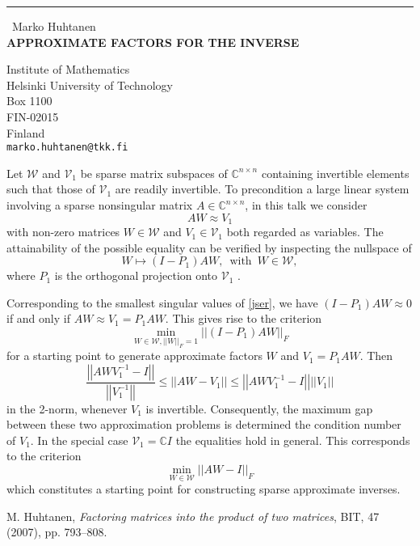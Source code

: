 \documentclass{report}
\begin{document}
\begin{center}
\rule{6in}{1pt} \
{\large Marko Huhtanen \\
{\bf APPROXIMATE FACTORS FOR THE INVERSE}}

Institute of Mathematics \\ Helsinki University of Technology \\ Box 1100 \\ FIN-02015 \\ Finland
\\
{\tt marko.huhtanen@tkk.fi}\end{center}

\def\setC{\mathbb{C}}

Let $\mathcal{W}$ and $\mathcal{V}_1$ be sparse matrix subspaces
of $\setC^{n \times n}$ containing
invertible elements such that those
of $\mathcal{V}_1$ are readily invertible.
To precondition a large linear system involving
a sparse nonsingular matrix $A\in \setC^{n \times n}$,
in this talk we consider
\begin{equation}\label{aproksi}
AW\approx V_1
\end{equation}
with non-zero matrices $W \in \mathcal{W}$ and $V_1 \in \mathcal{V}_1$
both regarded as variables.
The attainability of the possible equality
can be
verified by inspecting the nullspace of
\begin{equation}\label{jser}
W\longmapsto (I-P_1)AW,\, \mbox{ with }\, W\in \mathcal{W},
\end{equation}
where $P_1$ is the orthogonal
projection onto $\mathcal{V}_1$ \cite{HR}.

Corresponding to the smallest singular values of \eqref{jser},
we have $(I-P_1)AW \approx 0$ if and only if $AW\approx V_1=P_1AW$.
This gives rise to the criterion
$$\min_{W\in \mathcal{W}, \left|\left|W\right|\right|_F=1}
\left|\left|(I-P_1) AW\right|\right|_F
$$
for a starting point to generate approximate
factors $W$ and $V_1=P_1AW$. Then
$$\frac{\left| \left| AWV_1^{-1} -I\right|\right| }
{\left| \left| V_1^{-1} \right|\right| }\leq
\left| \left| AW-V_1 \right|\right|
\leq \left| \left| AWV_1^{-1} -I\right|\right|
\left| \left| V_1 \right|\right|
$$
in the 2-norm,
whenever $V_1$ is invertible.
Consequently,
the maximum gap between these two approximation problems
is determined the condition number of $V_1$.
In the special case $\mathcal{V}_1=\setC I$
the equalities hold in general. This corresponds
to the criterion
$$\min_{W\in \mathcal{W}}\left|\left| AW-I\right|\right|_F$$
which constitutes a starting point for constructing
sparse approximate inverses.

\begin{thebibliography}{1}

 {\sc M. Huhtanen}, {\em Factoring matrices into the product
of two matrices}, BIT, 47 (2007), pp. 793--808.
\end{thebibliography}
\end{document}
